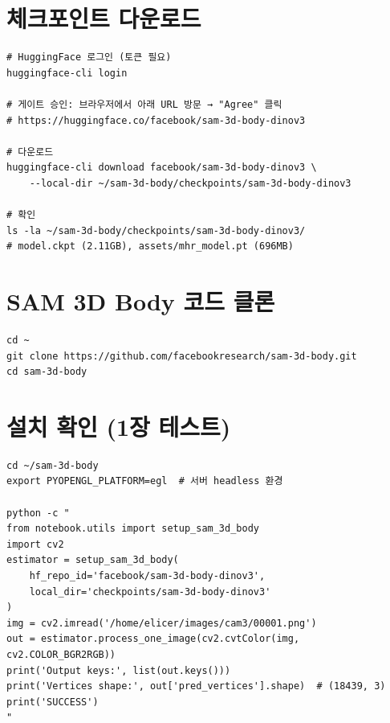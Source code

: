 \documentclass[11pt, a4paper]{report}
\begin{document}
\section{체크포인트 다운로드}

\begin{codebox}[title={HuggingFace 다운로드 (2.8GB, 1-5분)}]
\begin{verbatim}
# HuggingFace 로그인 (토큰 필요)
huggingface-cli login

# 게이트 승인: 브라우저에서 아래 URL 방문 → "Agree" 클릭
# https://huggingface.co/facebook/sam-3d-body-dinov3

# 다운로드
huggingface-cli download facebook/sam-3d-body-dinov3 \
    --local-dir ~/sam-3d-body/checkpoints/sam-3d-body-dinov3

# 확인
ls -la ~/sam-3d-body/checkpoints/sam-3d-body-dinov3/
# model.ckpt (2.11GB), assets/mhr_model.pt (696MB)
\end{verbatim}
\end{codebox}

\section{SAM 3D Body 코드 클론}

\begin{codebox}[title={레포 클론}]
\begin{verbatim}
cd ~
git clone https://github.com/facebookresearch/sam-3d-body.git
cd sam-3d-body
\end{verbatim}
\end{codebox}

\section{설치 확인 (1장 테스트)}

\begin{codebox}[title={단일 이미지 테스트}]
\begin{verbatim}
cd ~/sam-3d-body
export PYOPENGL_PLATFORM=egl  # 서버 headless 환경

python -c "
from notebook.utils import setup_sam_3d_body
import cv2
estimator = setup_sam_3d_body(
    hf_repo_id='facebook/sam-3d-body-dinov3',
    local_dir='checkpoints/sam-3d-body-dinov3'
)
img = cv2.imread('/home/elicer/images/cam3/00001.png')
out = estimator.process_one_image(cv2.cvtColor(img, cv2.COLOR_BGR2RGB))
print('Output keys:', list(out.keys()))
print('Vertices shape:', out['pred_vertices'].shape)  # (18439, 3)
print('SUCCESS')
"
\end{verbatim}
\end{codebox}
\end{document}
